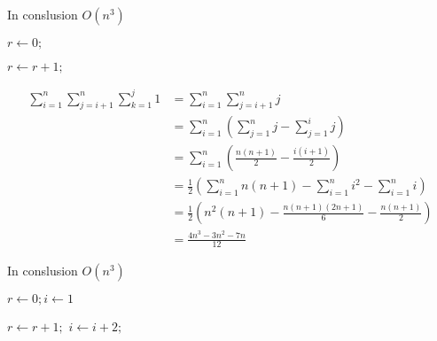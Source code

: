 In conslusion \(O(n^3)\)


\newpage
\begin{algorithm}[ht]
\caption{}
\begin{algorithmic}
\State \(r \gets 0;\)

\State \(r\gets r+1;\)
\EndFor
\EndFor
\EndFor
\end{algorithmic}
\end{algorithm}

\begin{align*}
\sum_{i=1}^n \sum_{j=i+1}^n \sum_{k=1}^{j} 1 &= \sum_{i=1}^n \sum_{j=i+1}^n j\\
                                             &= \sum_{i=1}^n (\sum_{j=1}^n j - \sum_{j=1}^{i} j)\\
                                             &= \sum_{i=1}^n (\frac{n(n+1)}{2} - \frac{i(i+1)}{2})\\
                                             &= \frac{1}{2}(\sum_{i=1}^n n(n+1) - \sum_{i=1}^n i^2 - \sum_{i=1}^n i)\\
                                             &= \frac{1}{2}(n^2(n+1) - \frac{n(n+1)(2n+1)}{6} - \frac{n(n+1)}{2})\\
                                             &= \frac{4n^3 - 3n^2 - 7n}{12}
\end{align*}

In conslusion \(O(n^3)\)

\newpage

\begin{algorithm}[ht]
\caption{}
\begin{algorithmic}
\State \(r \gets 0;i\gets 1\)

\State \(r\gets r+1;\)
\EndFor
\State \(i \gets i+2;\)
\EndWhile
\end{algorithmic}
\end{algorithm}

